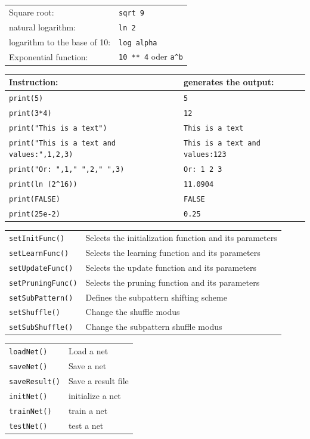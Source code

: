 {\newpage
\clearpage
\samepage \begin{tabular}{ll}
Square root: & \verb+sqrt 9+\\ 
natural logarithm: & \verb+ln 2+\\ 
logarithm to the base of 10: & \verb+log alpha+\\ 
Exponential function: & \verb+10 ** 4+ oder \verb+a^b+
\end{tabular}
}

{\newpage
\clearpage
\samepage \begin{tabular}{|l|l|}
\hline
Instruction: & generates the output: \rule[-3mm]{0mm}{8mm} \\  \hline
\verb+print(5)+ & \verb+5+\\ 
\verb+print(3*4)+ & \verb+12+\\ 
\verb+print("This is a text")+ & \verb+This is a text+\\ 
\verb+print("This is a text and values:",1,2,3)+ &  
\verb+This is a text and values:123+\\ 
\verb+print("Or: ",1," ",2," ",3)+ & \verb+Or: 1 2 3+\\ 
\verb+print(ln (2^16))+ & \verb+11.0904+\\ 
\verb+print(FALSE)+ & \verb+FALSE+\\ 
\verb+print(25e-2)+ & \verb+0.25+\\ 
\hline
\end{tabular}
}

{\newpage
\clearpage
\samepage \begin{tabular}{|l|l|} \hline
\verb+setInitFunc()+ & Selects the initialization function and its parameters\\ 
\verb+setLearnFunc()+ & Selects the learning function and its parameters\\ 
\verb+setUpdateFunc()+ & Selects the update function and its parameters\\ 
\verb+setPruningFunc()+ & Selects the pruning function and its parameters\\ 
\verb+setSubPattern()+ &Defines the subpattern shifting scheme\\ 
\verb+setShuffle()+ & Change the shuffle modus\\ 
\verb+setSubShuffle()+ & Change the subpattern shuffle modus\\  \hline
%
\end{tabular}
}

{\newpage
\clearpage
\samepage \begin{tabular}{|l|l|} \hline
\verb+loadNet()+ & Load a net\\ 
\verb+saveNet()+ & Save a net\\ 
\verb+saveResult()+ & Save a result file \\ 
\verb+initNet()+ & initialize a net\\ 
\verb+trainNet()+ & train a net \\ 
\verb+testNet()+ & test a net\\  \hline
\end{tabular}
}

